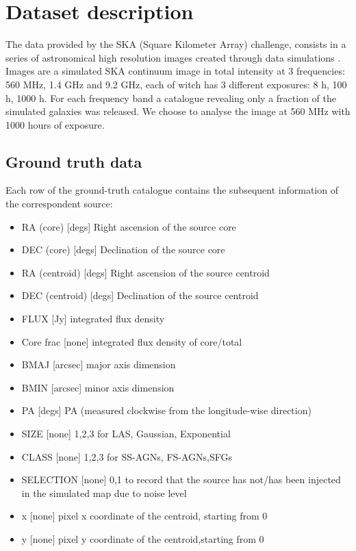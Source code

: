 \documentclass[a4paper,10pt]{report}
\begin{document}
\chapter{Dataset description}\label{chap:dataset-description}

The data provided by the SKA (Square Kilometer Array) challenge, consists in a series of astronomical high resolution images created through data simulations \cite{bonaldi2021square}.  Images are a simulated SKA continuum image in total intensity at 3 frequencies: 560 MHz, 1.4 GHz and  9.2 GHz, each of witch has 3 different exposures: 8 h, 100 h, 1000 h. For each frequency band a catalogue revealing only a fraction of the simulated galaxies was released. We choose to analyse the image at 560 MHz with 1000 hours of exposure. 

\section{Ground truth data}
Each row of the ground-truth catalogue contains the subsequent information of the correspondent source: 
\begin{itemize}
    \item RA (core)  [degs]    Right ascension of the source core
    \item DEC (core)    [degs]    Declination of the source core
    \item RA (centroid)    [degs]    Right ascension of the source centroid
    \item DEC (centroid)    [degs]    Declination of the source centroid
    \item FLUX    [Jy]    integrated flux density
    \item Core frac    [none]    integrated flux density of core/total
    \item  BMAJ    [arcsec]    major axis dimension
    \item  BMIN    [arcsec]    minor axis dimension
    \item  PA    [degs] PA (measured clockwise from the longitude-wise direction)
    \item    SIZE    [none]    1,2,3 for LAS, Gaussian, Exponential
    \item    CLASS    [none]    1,2,3 for SS-AGNs, FS-AGNs,SFGs
    \item  SELECTION    [none]  0,1 to record that the source has not/has been injected in the simulated map due to noise level
    \item    x    [none]    pixel x coordinate of the centroid, starting from 0
    \item   y    [none]    pixel y coordinate of the centroid,starting from 0
\end{itemize}
\end{document}
